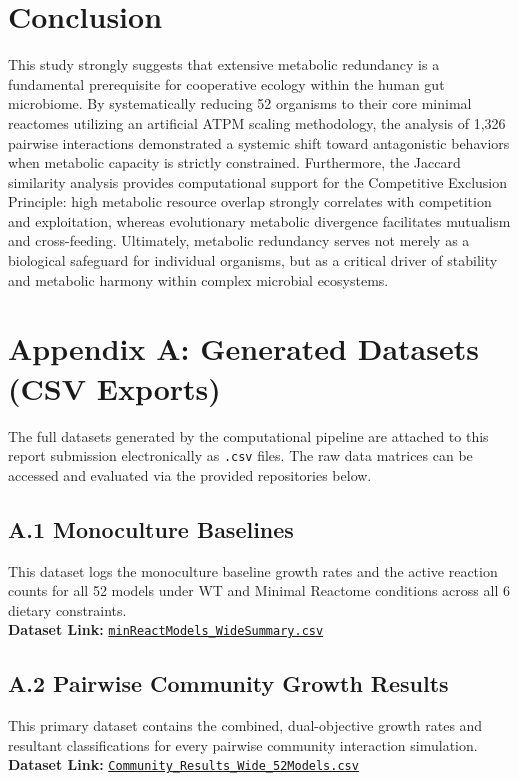 \documentclass[11pt, a4paper]{article}
\begin{document}
\section{Conclusion}
This study strongly suggests that extensive metabolic redundancy is a fundamental prerequisite for cooperative ecology within the human gut microbiome. By systematically reducing 52 organisms to their core minimal reactomes utilizing an artificial ATPM scaling methodology, the analysis of 1,326 pairwise interactions demonstrated a systemic shift toward antagonistic behaviors when metabolic capacity is strictly constrained. Furthermore, the Jaccard similarity analysis provides computational support for the Competitive Exclusion Principle: high metabolic resource overlap strongly correlates with competition and exploitation, whereas evolutionary metabolic divergence facilitates mutualism and cross-feeding. Ultimately, metabolic redundancy serves not merely as a biological safeguard for individual organisms, but as a critical driver of stability and metabolic harmony within complex microbial ecosystems.

\newpage
\section{Appendix A: Generated Datasets (CSV Exports)}
The full datasets generated by the computational pipeline are attached to this report submission electronically as \texttt{.csv} files. The raw data matrices can be accessed and evaluated via the provided repositories below.

\subsection{A.1 Monoculture Baselines}
This dataset logs the monoculture baseline growth rates and the active reaction counts for all 52 models under WT and Minimal Reactome conditions across all 6 dietary constraints.\\[1ex]
\textbf{Dataset Link:} \href{https://drive.google.com/file/d/16tFM3sCMiCcrVEg96z8FPKhaQhuYGHja/view?usp=sharing}{\texttt{minReactModels\_WideSummary.csv}}

\subsection{A.2 Pairwise Community Growth Results}
This primary dataset contains the combined, dual-objective growth rates and resultant classifications for every pairwise community interaction simulation.\\[1ex]
\textbf{Dataset Link:} \href{https://drive.google.com/file/d/1j2NNFteoVdkNZv8fuKT-bwdMF6rWRPhN/view?usp=sharing}{\texttt{Community\_Results\_Wide\_52Models.csv}}
\end{document}
